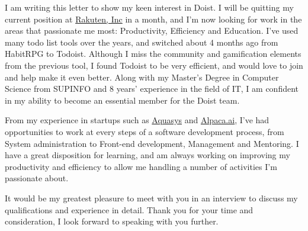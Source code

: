 \documentclass[10pt,stdletter,dateno,sigleft]{newlfm} %
\begin{document}
\begin{newlfm}


I am writing this letter to show my keen interest in Doist. I will be
quitting my current position at \href{http://global.rakuten.com/corp/}{Rakuten, Inc}
in a month, and I'm now looking for work in the areas that
passionate me most: Productivity, Efficiency and Education. I've used many
todo list tools over the years, and switched about 4 months ago from HabitRPG to
Todoist. Although I miss the community and gamification elements from the
previous tool, I found Todoist to be very efficient, and would love to join and
help make it even better. Along with my Master's Degree in Computer Science from
SUPINFO and 8 years' experience in the field of IT, I am confident in my ability
to become an essential member for the Doist team.

From my experience in startups such as
\href{http://www.aquasys.co.jp/}{Aquasys} and
\href{https://www.alpaca.ai/}{Alpaca.ai}, I've had opportunities to work at
every steps of a software development process, from System administration to
Front-end development, Management and Mentoring. I have a great disposition for
learning, and am always working on improving my productivity and efficiency to
allow me handling a number of activities I'm passionate about.

It would be my greatest pleasure to meet with you in an interview to discuss my
qualifications and experience in detail.  Thank you for your time and
consideration, I look forward to speaking with you further.


\end{newlfm}
\end{document}
